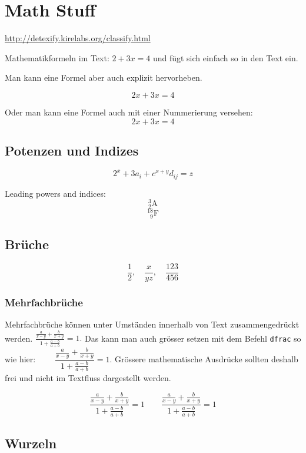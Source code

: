 \documentclass[10pt, a4paper]{article}
\numberwithin{equation}{section}
\numberwithin{figure}{section}
\begin{document}
\section{Math Stuff}

\url{http://detexify.kirelabs.org/classify.html}

Mathematikformeln im Text: \( 2 + 3x = 4\) und fügt sich einfach so in den Text ein.

Man kann eine Formel aber auch explizit hervorheben.

\[ 2x + 3x = 4 \]

Oder man kann eine Formel auch mit einer Nummerierung versehen:
\begin{equation}
2x + 3x = 4
\end{equation}

\subsection{Potenzen und Indizes}

\[ 2^x + 3a_i + c^{x+y}d_{ij} = z  \]


Leading powers and indices:
\[ {}^3_2\mathrm{A} \]
\[ {}^{18}_{\phantom{1}9}\mathrm{F} \]


\subsection{Brüche}

\[\frac{1}{2}, \quad \frac{x}{yz},\quad \frac{123}{456}\]

\subsubsection{Mehrfachbrüche}

Mehrfachbrüche können unter Umständen innerhalb von Text zusammengedrückt werden. \( \frac{\frac{a}{x-y}+\frac{b}{x+y}}{1+\frac{a-b}{a+b}} = 1. \) Das kann man auch gr\"osser setzen mit dem Befehl \texttt{dfrac} so wie hier: \( \qquad \dfrac{\frac{a}{x-y}+\frac{b}{x+y}}{1+\frac{a-b}{a+b}} = 1 \). Grössere mathematische Ausdrücke sollten deshalb frei und nicht im Textfluss dargestellt werden.

\[\frac{\frac{a}{x-y}+\frac{b}{x+y}}{1+\frac{a-b}{a+b}} = 1 \qquad \dfrac{\frac{a}{x-y}+\frac{b}{x+y}}{1+\frac{a-b}{a+b}} = 1 \]

\subsection{Wurzeln}
\end{document}
